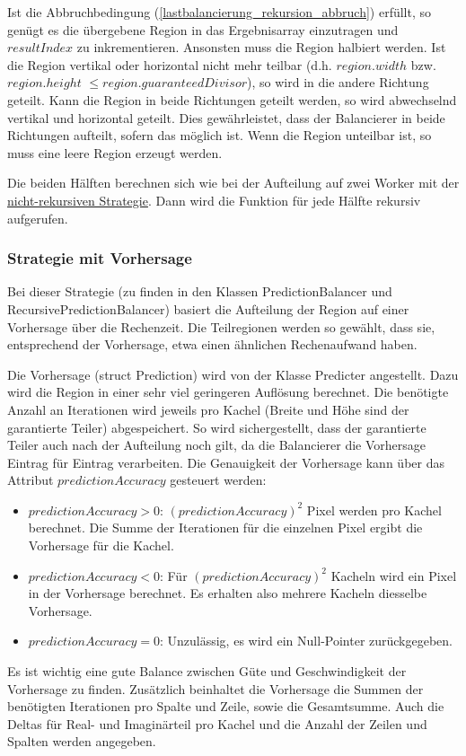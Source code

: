Ist die Abbruchbedingung (\ref{lastbalancierung_rekursion_abbruch}) erfüllt, so genügt es die übergebene Region in das Ergebnisarray einzutragen und $resultIndex$ zu inkrementieren.
Ansonsten muss die Region halbiert werden. Ist die Region vertikal oder horizontal nicht mehr teilbar (d.h. $region.width$ bzw. $region.height$ $\leq region.guaranteedDivisor$), so wird in die andere Richtung geteilt.
Kann die Region in beide Richtungen geteilt werden, so wird abwechselnd vertikal und horizontal geteilt. Dies gewährleistet, dass der Balancierer in beide Richtungen aufteilt, sofern das möglich ist.
Wenn die Region unteilbar ist, so muss eine leere Region erzeugt werden.

Die beiden Hälften berechnen sich wie bei der Aufteilung auf zwei Worker mit der \hyperref[lastbalancierung_naiv]{nicht-rekursiven Strategie}.
Dann wird die Funktion für jede Hälfte rekursiv aufgerufen.

\subsubsection{Strategie mit Vorhersage}

Bei dieser Strategie (zu finden in den Klassen PredictionBalancer und RecursivePredictionBalancer) basiert die Aufteilung der Region auf einer Vorhersage über die Rechenzeit.
Die Teilregionen werden so gewählt, dass sie, entsprechend der Vorhersage, etwa einen ähnlichen Rechenaufwand haben.

Die Vorhersage (struct Prediction) wird von der Klasse Predicter angestellt.
Dazu wird die Region in einer sehr viel geringeren Auflösung berechnet.
Die benötigte Anzahl an Iterationen wird jeweils pro Kachel (Breite und Höhe sind der garantierte Teiler) abgespeichert.
So wird sichergestellt, dass der garantierte Teiler auch nach der Aufteilung noch gilt, da die Balancierer die Vorhersage Eintrag für Eintrag verarbeiten.
Die Genauigkeit der Vorhersage kann über das Attribut $predictionAccuracy$ gesteuert werden:
\begin{itemize}
	\item $predictionAccuracy > 0$: $(predictionAccuracy)^2$ Pixel werden pro Kachel berechnet. Die Summe der Iterationen für die einzelnen Pixel ergibt die Vorhersage für die Kachel.
	\item $predictionAccuracy < 0$: Für $(predictionAccuracy)^2$ Kacheln wird ein Pixel in der Vorhersage berechnet. Es erhalten also mehrere Kacheln diesselbe Vorhersage.
	\item $predictionAccuracy = 0$: Unzulässig, es wird ein Null-Pointer zurückgegeben.
\end{itemize}
Es ist wichtig eine gute Balance zwischen Güte und Geschwindigkeit der Vorhersage zu finden.
Zusätzlich beinhaltet die Vorhersage die Summen der benötigten Iterationen pro Spalte und Zeile, sowie die Gesamtsumme.
Auch die Deltas für Real- und Imaginärteil pro Kachel und die Anzahl der Zeilen und Spalten werden angegeben.

